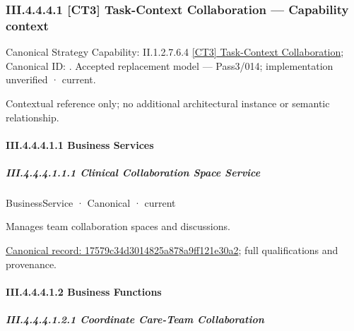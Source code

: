 \subsubsection*{III.4.4.4.1 [CT3] Task-Context Collaboration — Capability context}
\label{navigation:III.4.4.4.1}

{\small Canonical Strategy Capability: II.1.2.7.6.4 \hyperref[element:0ce2d4475d9e4fee8296f9101a6aa2af]{[CT3] Task-Context Collaboration}; Canonical ID: \texttt{}. Accepted replacement model — Pass3/014; implementation unverified · current.}\par
Contextual reference only; no additional architectural instance or semantic relationship.\par
\paragraph*{III.4.4.4.1.1 Business Services}
\label{navigation:III.4.4.4.1.1}

\subparagraph*{III.4.4.4.1.1.1 Clinical Collaboration Space Service}
\label{navigation:III.4.4.4.1.1.1}

\label{element:17579c34d3014825a878a9ff121e30a2}
{\small BusinessService · Canonical · current}\par

Manages team collaboration spaces and discussions.


{\footnotesize \href{../../../../../../../continuum/business/business-service/17579c34d3014825a878a9ff121e30a2.md}{Canonical record: 17579c34d3014825a878a9ff121e30a2}; full qualifications and provenance.}\par
\paragraph*{III.4.4.4.1.2 Business Functions}
\label{navigation:III.4.4.4.1.2}

\subparagraph*{III.4.4.4.1.2.1 Coordinate Care-Team Collaboration}
\label{navigation:III.4.4.4.1.2.1}

